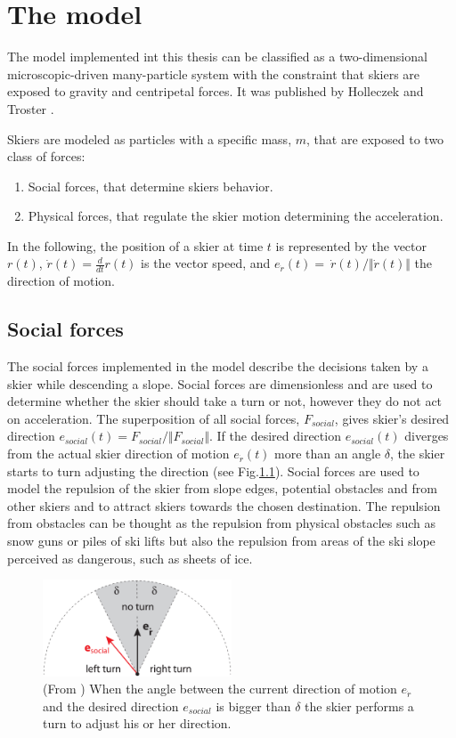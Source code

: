 \documentclass[12pt,a4paper,twoside]{book}
\begin{document}
\chapter{The model}\label{model}
The model implemented int this thesis can be classified as a two-dimensional microscopic-driven many-particle system with the constraint that skiers are exposed to gravity and centripetal forces. It was published by Holleczek and Troster \cite{hol2012}.

Skiers are modeled as particles with a specific mass, $m$, that are exposed to two class of forces:\begin{enumerate}
\item Social forces, that determine skiers behavior.
\item Physical forces, that regulate the skier motion determining the acceleration.
\end{enumerate}
In the following, the position of a skier at time $t$ is represented by the vector $r(t)$, $\dot{r}(t)=\frac{d}{dt}r(t)$ is the vector speed, and $e_{\dot{r}}(t)=\ \dot{r}(t) / \Vert \dot{r}(t)\Vert$ the direction of motion.

\section{Social forces}
The social forces implemented in the model describe the decisions taken by a skier while descending a slope. Social forces are dimensionless and are used to determine whether the skier should take a turn or not, however they do not act on acceleration. The superposition of all social forces, $F_{social}$, gives skier's desired direction $e_{social}(t)=F_{social} / \Vert F_{social} \Vert$. If the desired direction $e_{social}(t)$ diverges from the actual skier direction of motion $e_{\dot{r}}(t)$ more than an angle ${\delta}$, the skier starts to turn adjusting the direction (see Fig.\ref{start_turn_pic}). Social forces are used to model the repulsion of the skier from slope edges, potential obstacles and from other skiers and to attract skiers towards the chosen destination. The repulsion from obstacles can be thought as the repulsion from physical obstacles such as snow guns or piles of ski lifts but also the repulsion from areas of the ski slope perceived as dangerous, such as sheets of ice.

\begin{figure}
  \begin{center}
    \includegraphics[width=0.5\textwidth]{images/start_turn_pic.eps}
    \caption{(From \cite{hol2012}) When the angle between the current direction of motion $e_{\dot{r}}$ and the desired direction $e_{social}$ is bigger than $\delta$ the skier performs a turn to adjust his or her direction.}\label{start_turn_pic}
  \end{center}
\end{figure}
\end{document}
